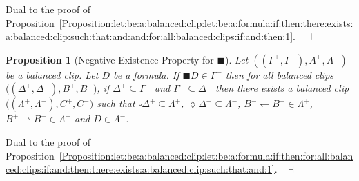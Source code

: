 \documentclass[draft]{article}
\newtheorem{proposition}{Proposition}
\newenvironment{proof}{{\bf Proof:}}{~$\dashv$\\}
\begin{document}
%
%
\begin{proof}
%
%
Dual to the proof of Proposition~\ref{Proposition:let:be:a:balanced:clip:let:be:a:formula:if:then:there:exists:a:balanced:clip:such:that:and:and:for:all:balanced:clips:if:and:then:1}.
%
%
\medskip
%
%
\end{proof}
%
%
\begin{proposition}[Negative Existence Property for $\blacksquare$]\label{Proposition:let:be:a:balanced:clip:let:be:a:formula:if:then:for:all:balanced:clips:if:and:then:there:exists:a:balanced:clip:such:that:and:2}
%
%
Let $((\Gamma^{+},\Gamma^{-}),A^{+},A^{-})$ be a balanced clip.
Let $D$ be a formula.
If ${\blacksquare}D{\in}\Gamma^{-}$ then for all balanced clips $((\Delta^{+},\Delta^{-}),
%
%
%
%
%
%
%
$\linebreak$
%
%
%
%
%
%
B^{+},B^{-})$, if $\Delta^{+}{\subseteq}\Gamma^{+}$ and $\Gamma^{-}{\subseteq}\Delta^{-}$ then there exists a balanced clip $((\Lambda^{+},\Lambda^{-}),C^{+},
%
%
%
%
%
%
%
$\linebreak$
%
%
%
%
%
%
C^{-})$ such that ${\square}\Delta^{+}{\subseteq}\Lambda^{+}$, ${\lozenge}\Delta^{-}{\subseteq}\Lambda^{-}$, $B^{-}{\leftharpoondown}B^{+}{\in}\Lambda^{+}$, $B^{+}{\rightharpoonup}B^{-}{\in}\Lambda^{-}$ and $D{\in}\Lambda^{-}$.
%
%
\end{proposition}
%
%
\begin{proof}
%
%
Dual to the proof of Proposition~\ref{Proposition:let:be:a:balanced:clip:let:be:a:formula:if:then:for:all:balanced:clips:if:and:then:there:exists:a:balanced:clip:such:that:and:1}.
%
%
\medskip
%
%
\end{proof}
%
%
%
%
\end{document}
